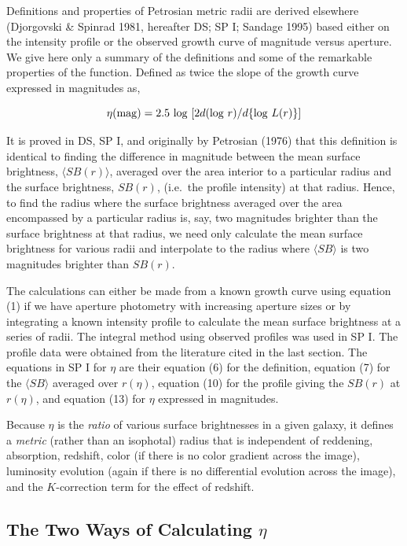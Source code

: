 \documentclass[preprint]{aastex}
\begin{document}
Definitions and properties of Petrosian metric radii are derived
elsewhere (Djorgovski \& Spinrad 1981, hereafter DS; SP I; Sandage
1995) based either on the intensity profile or the observed growth
curve of magnitude versus aperture. We give here only a summary of the
definitions and some of the remarkable properties of the function.
Defined as twice the slope of the growth curve expressed in magnitudes
as,

\begin{equation}
     \eta ({\rm mag}) = 2.5~{\rm log}~[2d({\rm log}~r)/d\{{\rm log}~L(r)\}]
\end{equation}

\noindent It is proved in DS, SP I, and originally by Petrosian (1976)
that this definition is identical to finding the difference in
magnitude between the mean surface brightness, $\langle SB(r)\rangle$,
averaged over the area interior to a particular radius and the surface
brightness, $SB(r)$, (i.e.\ the profile intensity) at that
radius. Hence, to find the radius where the surface brightness
averaged over the area encompassed by a particular radius is, say, two
magnitudes brighter than the surface brightness at that radius, we
need only calculate the mean surface brightness for various radii and
interpolate to the radius where $\langle SB \rangle$ is two magnitudes
brighter than $SB(r)$.

The calculations can either be made from a known growth curve using
equation (1) if we have aperture photometry with increasing aperture
sizes or by integrating a known intensity profile to calculate the
mean surface brightness at a series of radii. The integral method
using observed profiles was used in SP I. The profile data were
obtained from the literature cited in the last section. The equations
in SP I for $\eta$ are their equation (6) for the definition, equation
(7) for the $\langle SB \rangle$ averaged over $r(\eta)$, equation
(10) for the profile giving the $SB(r)$ at $r(\eta)$, and equation
(13) for $\eta$ expressed in magnitudes.

Because $\eta$ is the {\it ratio} of various surface brightnesses in a
given galaxy, it defines a {\it metric} (rather than an isophotal)
radius that is independent of reddening, absorption, redshift, color
(if there is no color gradient across the image), luminosity evolution
(again if there is no differential evolution across the image), and
the $K$-correction term for the effect of redshift.

\subsection{The Two Ways of Calculating $\eta$}
\end{document}

